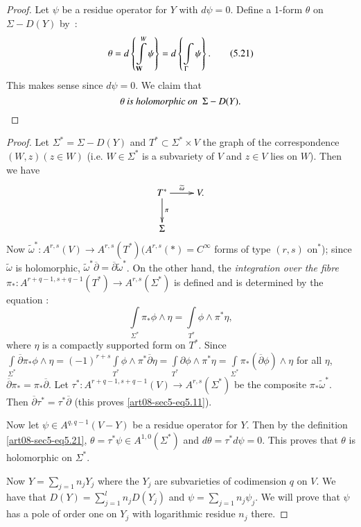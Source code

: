 \begin{proof}
Let $\psi$ be a residue operator for $Y$ with $d\psi=0$. Define a 1-form $\theta$ on $\Sigma-D(Y)$ by~:
\begin{equation*}
\theta=d\left\{\int\limits^{W}_{\mathbf{W}}\psi\right\}=d\left\{\int\limits_{\Gamma}\psi\right\}.\tag{5.21}\label{art08-sec5-eq5.21}
\end{equation*}
This makes sense since $d\psi=0$. We claim that
$$
\theta\text{~\em is holomorphic on~ } \Sigma-D(Y).
$$
\end{proof}

\begin{proof}
Let $\Sigma^{*}=\Sigma-D(Y)$ and $T^{*}\subset \Sigma^{*}\times V$ the graph of the correspondence $(W,z)(z\in W)$ (i.e. $W\in \Sigma^{*}$ is a subvariety of $V$ and $z\in V$ lies on $W$). Then we have
\[
\xymatrix{
T^{*}\ar[r]^-{\widetilde{\omega}}\ar[d]^-{\pi} & V.\\
\Sigma & 
}
\]\pageoriginale
Now $\widetilde{\omega}^{*}:A^{r,s}(V)\to A^{r,s}(T^{*})(A^{r,s}(*)=C^{\infty}$ forms of type $(r,s)$ on$^{*}$); since $\widetilde{\omega}$ is holomorphic, $\widetilde{\omega}^{*}\overline{\partial}=\overline{\partial}\widetilde{\omega}^{*}$. On the other hand, the {\em integration over the fibre} $\pi_{*}:A^{r+q-1,s+q-1}(T^{*})\to A^{r,s}(\Sigma^{*})$ is defined and is determined by the equation :
\begin{equation*}
\int\limits_{\Sigma^{*}}\pi_{*}\phi\wedge \eta=\int\limits_{T^{*}}\phi\wedge \pi^{*}\eta,\tag{5.22}\label{art08-sec5-eq5.22}
\end{equation*}
where $\eta$ is a compactly supported form on $T^{*}$. Since $\int\limits_{\Sigma^{*}}\overline{\partial}\pi_{*}\phi\wedge \eta=(-1)^{r+s}\int\limits_{T^{*}}\phi\wedge \pi^{*}\overline{\partial}\eta=\int\limits_{T^{*}}\partial \phi\wedge \pi^{*}\eta=\int\limits_{\Sigma^{*}}\pi_{*}(\overline{\partial}\phi)\wedge \eta$ for all $\eta$, $\overline{\partial}\pi_{*}=\pi_{*}\overline{\partial}$. Let $\tau^{*}:A^{r+q-1,s+q-1}(V)\to A^{r,s}(\Sigma^{*})$ be the composite $\pi_{*}\widetilde{\omega}^{*}$. Then $\overline{\partial}\tau^{*}=\tau^{*}\overline{\partial}$ (this proves \eqref{art08-sec5-eq5.11}).

Now let $\psi\in A^{q,q-1}(V-Y)$ be a residue operator for $Y$. Then by the definition \eqref{art08-sec5-eq5.21}, $\theta=\tau^{*}\psi\in A^{1,0}(\Sigma^{*})$ and $d\theta=\tau^{*}d\psi=0$. This proves that $\theta$ is holomorphic on $\Sigma^{*}$.

Now $Y=\sum\limits_{j=1}n_{j}Y_{j}$ where the $Y_{j}$ are subvarieties of codimension $q$ on $V$. We have that $D(Y)=\sum\limits^{l}_{j=1}n_{j}D(Y_{j})$ and $\psi=\sum\limits_{j=1}n_{j}\psi_{j}$. We will prove that $\psi$ has a pole of order one on $Y_{j}$ with logarithmic residue $n_{j}$ there.
\end{proof}

